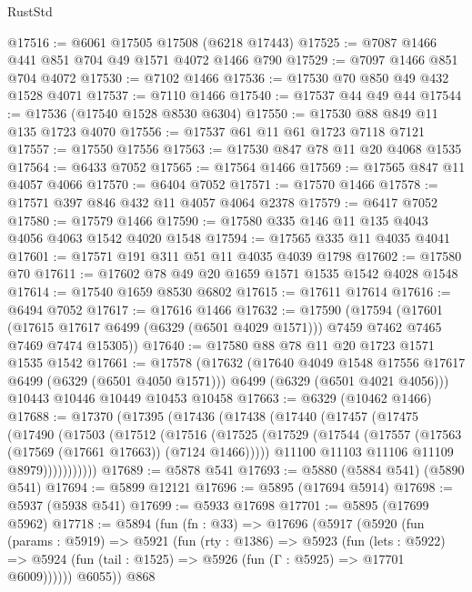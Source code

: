 \begin{lexlean}{RustStd}
\begin{coremodule}
{{@17516 := @6061 @17505 @17508 (@6218 @17443)
@17525 := @7087 @1466 @441 @851 @704 @49 @1571 @4072 @1466 @790
@17529 := @7097 @1466 @851 @704 @4072
@17530 := @7102 @1466
@17536 := @17530 @70 @850 @49 @432 @1528 @4071
@17537 := @7110 @1466
@17540 := @17537 @44 @49 @44
@17544 := @17536 (@17540 @1528 @8530 @6304)
@17550 := @17530 @88 @849 @11 @135 @1723 @4070
@17556 := @17537 @61 @11 @61 @1723 @7118 @7121
@17557 := @17550 @17556
@17563 := @17530 @847 @78 @11 @20 @4068 @1535
@17564 := @6433 @7052
@17565 := @17564 @1466
@17569 := @17565 @847 @11 @4057 @4066
@17570 := @6404 @7052
@17571 := @17570 @1466
@17578 := @17571 @397 @846 @432 @11 @4057 @4064 @2378
@17579 := @6417 @7052
@17580 := @17579 @1466
@17590 := @17580 @335 @146 @11 @135 @4043 @4056 @4063 @1542 @4020 @1548
@17594 := @17565 @335 @11 @4035 @4041
@17601 := @17571 @191 @311 @51 @11 @4035 @4039 @1798
@17602 := @17580 @70
@17611 := @17602 @78 @49 @20 @1659 @1571 @1535 @1542 @4028 @1548
@17614 := @17540 @1659 @8530 @6802
@17615 := @17611 @17614
@17616 := @6494 @7052
@17617 := @17616 @1466
@17632 := @17590
    (@17594
      (@17601
        (@17615 @17617 @6499 (@6329 (@6501 @4029 @1571)))
        @7459
        @7462
        @7465
        @7469
        @7474
        @15305))
@17640 := @17580 @88 @78 @11 @20 @1723 @1571 @1535 @1542
@17661 := @17578
    (@17632
      (@17640 @4049 @1548 @17556 @17617 @6499 (@6329 (@6501 @4050 @1571)))
      @6499
      (@6329 (@6501 @4021 @4056)))
    @10443
    @10446
    @10449
    @10453
    @10458
@17663 := @6329 (@10462 @1466)
@17688 := @17370
    (@17395
      (@17436
        (@17438
          (@17440
            (@17457
              (@17475
                (@17490
                  (@17503
                    (@17512
                      (@17516
                        (@17525
                          (@17529 (@17544 (@17557 (@17563 (@17569 (@17661 @17663)) (@7124 @1466)))))
                          @11100
                          @11103
                          @11106
                          @11109
                          @8979)))))))))))
@17689 := @5878 @541
@17693 := @5880 (@5884 @541) (@5890 @541)
@17694 := @5899 @12121
@17696 := @5895 (@17694 @5914)
@17698 := @5937 (@5938 @541)
@17699 := @5933 @17698
@17701 := @5895 (@17699 @5962)
@17718 := @5894
    (fun (fn : @33) =>
    @17696
      (@5917
        (@5920
          (fun (params : @5919) =>
          @5921
            (fun (rty : @1386) =>
            @5923
              (fun (lets : @5922) =>
              @5924 (fun (tail : @1525) => @5926 (fun (Γ : @5925) => @17701 @6009))))))
        @6055))
    @868
}}
\end{coremodule}
\end{lexlean}
